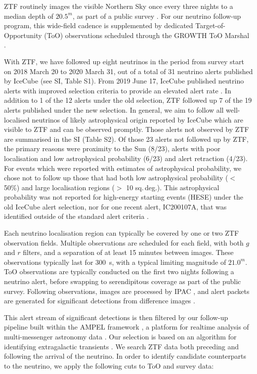  ZTF routinely images the visible Northern Sky once every three nights to a median depth of $20.5^{m}$, as part of a public survey \cite{ztf_survey_19, ztf_19_science}. For our neutrino follow-up program, this wide-field cadence is supplemented by dedicated Target-of-Opportunity (ToO) observations scheduled through the GROWTH ToO Marshal \cite{coughlin_19}. 

With ZTF, we have followed up eight neutrinos in the period from survey start on 2018 March 20 to 2020 March 31, out of a total of 31 neutrino alerts published by IceCube (see SI, Table S1). From 2019 June 17, IceCube published neutrino alerts with improved selection criteria to provide an elevated alert rate . In addition to 1 of the 12 alerts under the old selection, ZTF  followed up 7 of the 19 alerts published under the new selection. In general, we aim to follow all well-localised neutrinos of likely astrophysical origin reported by IceCube which are visible to ZTF and can be observed promptly. Those alerts not observed by ZTF are summarised in the SI (Table S2). Of those 23 alerts not followed up by ZTF, the primary reasons were proximity to the Sun (8/23), alerts with poor localisation and low astrophysical probability (6/23) and alert retraction (4/23). For events which were reported with estimates of astrophysical probability, we chose not to follow up those that had both low astrophysical probability ($<$ 50\%) and large localisation regions ($>$ 10 sq.\,deg.). This astrophysical probability was not reported for high-energy starting events (HESE) under the old IceCube alert selection, nor for one recent alert, IC200107A, that was identified outside of the standard alert criteria \cite{stein:gcn26655}.

Each neutrino localisation region can typically be covered by one or two ZTF observation fields. Multiple observations are scheduled for each field, with both $g$ and $r$ filters, and a separation of at least 15 minutes between images. These observations typically last for 300~s, with a typical limiting magnitude of $21.0^{m}$.  ToO observations are typically conducted on the first two nights following a neutrino alert, before swapping to serendipitous coverage as part of the public survey. Following observations, images are processed by IPAC \cite{ztf_data_processing}, and alert packets are generated for significant detections from difference images \cite{zads_19}.

This alert stream of significant detections is then filtered by our follow-up pipeline built within the AMPEL framework \cite{ampel_followup_pipeline}, a platform for realtime analysis of multi-messenger astronomy data \cite{ampel}. Our selection is based on an algorithm for identifying extragalactic transients \cite{ampel}. We search ZTF data both preceding and following the arrival of the neutrino. In order to identify candidate counterparts to the neutrino, we apply the following cuts to ToO and survey data:

